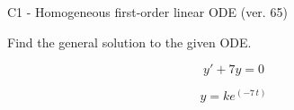 \begin{exercise}
  \begin{exerciseTitle}C1 - Homogeneous first-order linear ODE (ver. 65)\end{exerciseTitle}
  \begin{exerciseStatement}
    
Find the general solution to the given ODE.

    
\[y'+7y=0\]

  \end{exerciseStatement}
  \begin{exerciseAnswer}
    
\[y= k e^{\left(-7 \, t\right)}\]

  \end{exerciseAnswer}
\end{exercise}